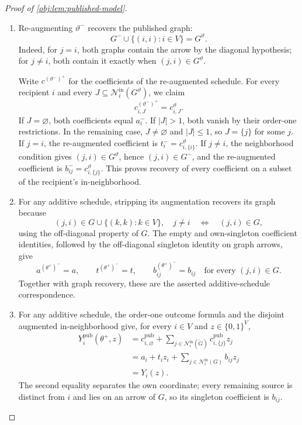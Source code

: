 \documentclass[11pt]{article}
\begin{document}
\begin{proof}[Proof of \cref{obj:lem:published-model}]
\begin{enumerate}
\item Re-augmenting \(\vartheta^-\) recovers the published graph:
\[
G^-\cup\{(i,i):i\in V\}=G^\vartheta.
\]
Indeed, for \(j=i\), both graphs contain the arrow by the diagonal hypothesis; for \(j\ne i\), both contain it exactly when \((j,i)\in G^\vartheta\).

Write \(c^{(\vartheta^-)^+}\) for the coefficients of the re-augmented schedule. For every recipient \(i\) and every
\(J\subseteq\mathcal N^{\mathrm{in}}_i(G^\vartheta)\), we claim
\[
c^{(\vartheta^-)^+}_{i,J}=c^\vartheta_{i,J}.
\]
If \(J=\varnothing\), both coefficients equal \(a_i^-\).
If \(|J|>1\), both vanish by their order-one restrictions.
In the remaining case, \(J\ne\varnothing\) and \(|J|\le1\), so \(J=\{j\}\) for some \(j\). If \(j=i\), the re-augmented coefficient is
\(t_i^-=c^\vartheta_{i,\{i\}}\). If \(j\ne i\), the neighborhood condition gives
\((j,i)\in G^\vartheta\), hence \((j,i)\in G^-\), and the re-augmented coefficient is
\(b_{ij}^-=c^\vartheta_{i,\{j\}}\).
This proves recovery of every coefficient on a subset of the recipient's in-neighborhood.

\item For any additive schedule, stripping its augmentation recovers its graph because
\[
(j,i)\in G\cup\{(k,k):k\in V\},\quad j\ne i
\quad\Longleftrightarrow\quad
(j,i)\in G,
\]
using the off-diagonal property of \(G\). The empty and own-singleton coefficient identities, followed by the off-diagonal singleton identity on graph arrows, give
\[
a^{(\theta^+)^-}=a,\qquad
t^{(\theta^+)^-}=t,\qquad
b^{(\theta^+)^-}_{ij}=b_{ij}
\quad\text{for every }(j,i)\in G.
\]
Together with graph recovery, these are the asserted additive-schedule correspondence.

\item For any additive schedule, the order-one outcome formula and the disjoint augmented in-neighborhood give, for every \(i\in V\) and \(z\in\{0,1\}^V\),
\[
\begin{aligned}
Y_i^{\mathrm{pub}}(\theta^+,z)
&=
c^{\mathrm{pub}}_{i,\varnothing}
+\sum_{j\in\mathcal N^{\mathrm{in}}_i(\widetilde G)}
c^{\mathrm{pub}}_{i,\{j\}}z_j\\
&=
a_i+t_i z_i
+\sum_{j\in\mathcal N^{\mathrm{in}}_i(G)}b_{ij}z_j\\
&=Y_i(z).
\end{aligned}
\]
The second equality separates the own coordinate; every remaining source is distinct from \(i\) and lies on an arrow of \(G\), so its singleton coefficient is \(b_{ij}\).


\end{enumerate}
\end{proof}
\end{document}
